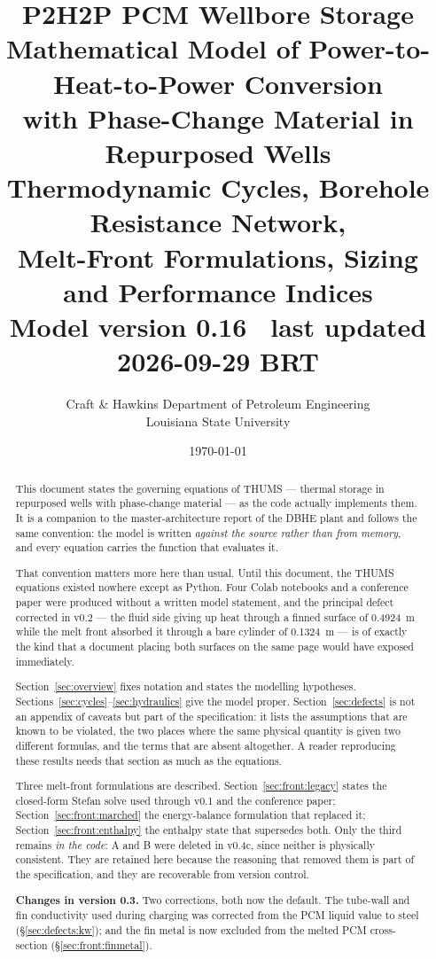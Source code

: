 \documentclass[11pt]{article}
\title{\textbf{P2H2P PCM Wellbore Storage}\\[4pt]
\large Mathematical Model of Power-to-Heat-to-Power Conversion\\
with Phase-Change Material in Repurposed Wells\\[6pt]
\normalsize Thermodynamic Cycles, Borehole Resistance Network,\\
Melt-Front Formulations, Sizing and Performance Indices\\[4pt]
\normalsize Model version 0.16 \textperiodcentered\ last updated 2026-09-29 BRT}
\author{Craft \& Hawkins Department of Petroleum Engineering\\
Louisiana State University}
\date{\today}
\begin{document}
\maketitle

\begin{abstract}
This document states the governing equations of THUMS --- thermal storage in
repurposed wells with phase-change material --- as the code actually implements
them. It is a companion to the master-architecture report of the DBHE plant and
follows the same convention: the model is written \emph{against the source
rather than from memory}, and every equation carries the function that evaluates
it.

That convention matters more here than usual. Until this document, the THUMS
equations existed nowhere except as Python. Four Colab notebooks and a
conference paper were produced without a written model statement, and the
principal defect corrected in v0.2 --- the fluid side giving up heat through a
finned surface of \SI{0.4924}{\meter} while the melt front absorbed it through a
bare cylinder of \SI{0.1324}{\meter} --- is of exactly the kind that a document
placing both surfaces on the same page would have exposed immediately.

Section~\ref{sec:overview} fixes notation and states the modelling hypotheses.
Sections~\ref{sec:cycles}--\ref{sec:hydraulics} give the model proper.
Section~\ref{sec:defects} is not an appendix of caveats but part of the
specification: it lists the assumptions that are known to be violated, the two
places where the same physical quantity is given two different formulas, and the
terms that are absent altogether. A reader reproducing these results needs that
section as much as the equations.

Three melt-front formulations are described. Section~\ref{sec:front:legacy}
states the closed-form Stefan solve used through v0.1 and the conference paper;
Section~\ref{sec:front:marched} the energy-balance formulation that replaced it;
Section~\ref{sec:front:enthalpy} the enthalpy state that supersedes both. Only
the third remains \emph{in the code}: A and B were deleted in v0.4c, since
neither is physically consistent. They are retained here because the reasoning
that removed them is part of the specification, and they are recoverable from
version control.

\medskip
\noindent\textbf{Changes in version 0.3.} Two corrections, both now the default.
The tube-wall and fin conductivity used during charging was corrected from the
PCM liquid value to steel (\S\ref{sec:defects:kw}); and the fin metal is now
excluded from the melted PCM cross-section (\S\ref{sec:front:finmetal}).


\end{abstract}
\end{document}
